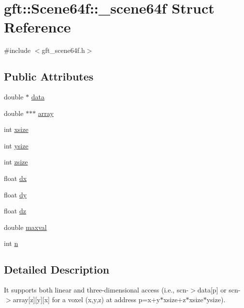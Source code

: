 \hypertarget{structgft_1_1Scene64f_1_1__scene64f}{}\section{gft\+:\+:Scene64f\+:\+:\+\_\+scene64f Struct Reference}
\label{structgft_1_1Scene64f_1_1__scene64f}


{\ttfamily \#include $<$gft\+\_\+scene64f.\+h$>$}

\subsection*{Public Attributes}
\begin{DoxyCompactItemize}
\item 
double $\ast$ \hyperlink{structgft_1_1Scene64f_1_1__scene64f_aec3e25514ed6095fe591edf9a1236784}{data}
\item 
double $\ast$$\ast$$\ast$ \hyperlink{structgft_1_1Scene64f_1_1__scene64f_a5915e77353237ae4daf712e117c7e2c6}{array}
\item 
int \hyperlink{structgft_1_1Scene64f_1_1__scene64f_a70afaf6bd167e7ee4b2d7394d7636fce}{xsize}
\item 
int \hyperlink{structgft_1_1Scene64f_1_1__scene64f_a380678d21dc4a7187306550e9104d167}{ysize}
\item 
int \hyperlink{structgft_1_1Scene64f_1_1__scene64f_a1246232c6a1828badcc862f6dc3259a9}{zsize}
\item 
float \hyperlink{structgft_1_1Scene64f_1_1__scene64f_adde0de68578a6d948d2fcbd6b82fbaa7}{dx}
\item 
float \hyperlink{structgft_1_1Scene64f_1_1__scene64f_a649207f750770bc555947752003b2ef1}{dy}
\item 
float \hyperlink{structgft_1_1Scene64f_1_1__scene64f_a97bbee03871a9d6845d280222c58a130}{dz}
\item 
double \hyperlink{structgft_1_1Scene64f_1_1__scene64f_aa3a9cc2ce61f403b1cfd906226699513}{maxval}
\item 
int \hyperlink{structgft_1_1Scene64f_1_1__scene64f_ab7464ba36e23d53135dcab4e369e591f}{n}
\end{DoxyCompactItemize}


\subsection{Detailed Description}
It supports both linear and three-\/dimensional access (i.\+e., scn-\/$>$data\mbox{[}p\mbox{]} or scn-\/$>$array\mbox{[}z\mbox{]}\mbox{[}y\mbox{]}\mbox{[}x\mbox{]} for a voxel (x,y,z) at address p=x+y$\ast$xsize+z$\ast$xsize$\ast$ysize). 

